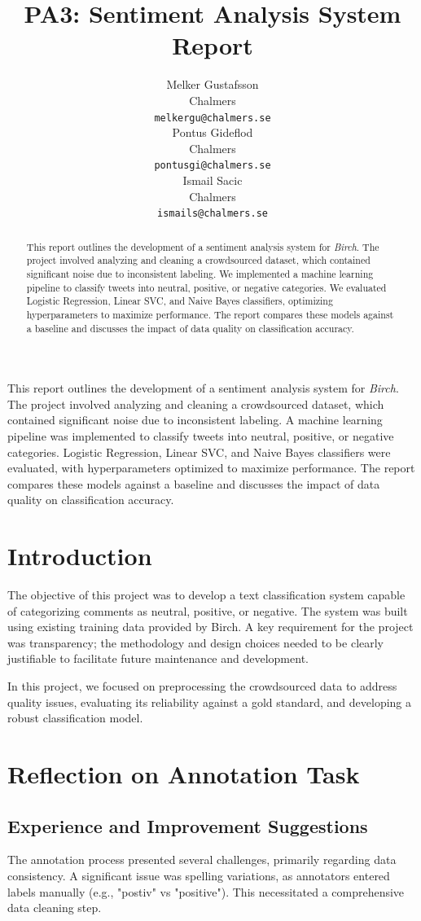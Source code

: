 \documentclass[11pt]{article}
\title{PA3: Sentiment Analysis System Report}
\author{Melker Gustafsson \\
  Chalmers \\
  {\tt melkergu@chalmers.se} \\\And
  Pontus Gideflod \\
  Chalmers \\
  {\tt pontusgi@chalmers.se} \\\And
  Ismail Sacic \\
  Chalmers \\
  {\tt ismails@chalmers.se} \\}
\date{}
\begin{document}
\maketitle
\begin{abstract}
This report outlines the development of a sentiment analysis system for \textit{Birch}. The project involved analyzing and cleaning a crowdsourced dataset, which contained significant noise due to inconsistent labeling. We implemented a machine learning pipeline to classify tweets into neutral, positive, or negative categories. We evaluated Logistic Regression, Linear SVC, and Naive Bayes classifiers, optimizing hyperparameters to maximize performance. The report compares these models against a baseline and discusses the impact of data quality on classification accuracy.
\end{abstract}
This report outlines the development of a sentiment analysis system for \textit{Birch}. The project involved analyzing and cleaning a crowdsourced dataset, which contained significant noise due to inconsistent labeling. A machine learning pipeline was implemented to classify tweets into neutral, positive, or negative categories. Logistic Regression, Linear SVC, and Naive Bayes classifiers were evaluated, with hyperparameters optimized to maximize performance. The report compares these models against a baseline and discusses the impact of data quality on classification accuracy.
\section{Introduction}
The objective of this project was to develop a text classification system capable of categorizing comments as neutral, positive, or negative. The system was built using existing training data provided by Birch. A key requirement for the project was transparency; the methodology and design choices needed to be clearly justifiable to facilitate future maintenance and development.

In this project, we focused on preprocessing the crowdsourced data to address quality issues, evaluating its reliability against a gold standard, and developing a robust classification model.

\section{Reflection on Annotation Task}

\subsection{Experience and Improvement Suggestions}
The annotation process presented several challenges, primarily regarding data consistency. A significant issue was spelling variations, as annotators entered labels manually (e.g., "postiv" vs "positive"). This necessitated a comprehensive data cleaning step.
\end{document}
